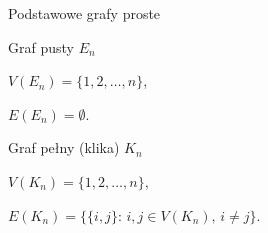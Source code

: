 \documentclass[a4paper,10pt]{beamer}
\begin{document}
\begin{frame}{Podstawowe grafy proste}
	
	\begin{block}{Graf pusty $E_n$}	
			
		\begin{minipage}{.45\textwidth}
			$V(E_n)=\{1,2,\ldots,n\}$,
			
			$E(E_n)=\emptyset$.
		\end{minipage}
		\begin{minipage}{.45\textwidth}
			\begin{center}
				
			\end{center}
		\end{minipage}
	\end{block}
		

	\begin{block}{Graf pełny (klika) $K_n$}
		
	\begin{minipage}{.52\textwidth}
	$V(K_n)=\{1,2,\ldots,n\}$,
	
	$E(K_n)=\big\{\{i,j\}:\,i,j\in V(K_n),\,i\neq j\big\}$.
	\end{minipage}
	\begin{minipage}{.3\textwidth}
	\begin{center}

	\end{center}
	\end{minipage}	
	\end{block}

\end{frame}
\end{document}
